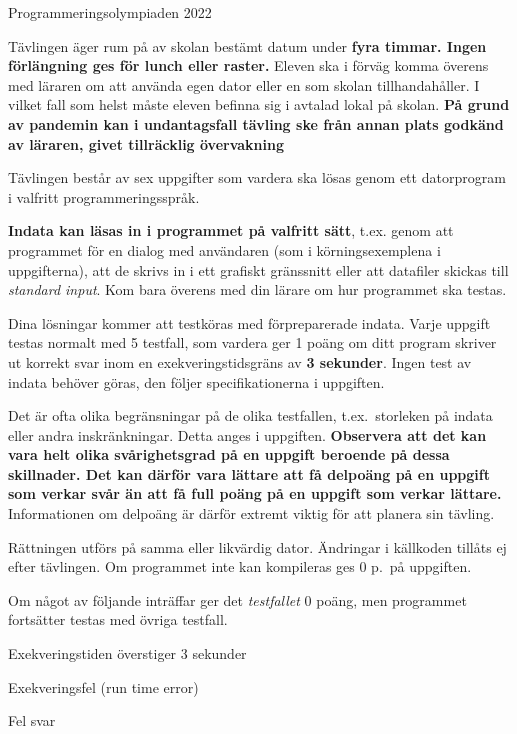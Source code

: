 
\thispagestyle{fancy}
\lstset{basicstyle=\ttfamily,
  breaklines=true}

\begin{center}
\Huge{Programmeringsolympiaden 2022}
\end{center}
\vspace{-1.2cm} 
\begin{lista}
\item Tävlingen äger rum på av skolan bestämt datum under {\bf fyra
    timmar. Ingen förlängning ges för lunch eller raster.} Eleven ska i förväg komma överens med läraren om att använda egen dator eller en som skolan tillhandahåller. I vilket fall som helst måste eleven befinna sig i avtalad lokal på skolan. {\bf På grund av pandemin kan i undantagsfall tävling ske från annan plats godkänd av läraren, givet tillräcklig övervakning}
\item Tävlingen består av sex uppgifter som vardera ska lösas genom ett
  datorprogram i valfritt programmeringsspråk.
\item {\bf Indata kan läsas in i programmet på valfritt sätt}, t.ex. genom att programmet för en dialog med användaren (som i körningsexemplena i uppgifterna), att de skrivs in i ett grafiskt gränssnitt eller att datafiler skickas till {\em standard input}. Kom bara överens med din lärare om hur programmet ska testas.
\item Dina lösningar kommer att testköras med förpreparerade
  indata. Varje uppgift testas normalt med 5 testfall, som vardera ger
  1 poäng om ditt program skriver ut korrekt svar inom en exekveringstidsgräns av
  {\bf 3 sekunder}. Ingen test av indata behöver göras, den följer specifikationerna 
i uppgiften.
\item Det är ofta olika begränsningar på de olika testfallen, t.ex.\ storleken på
indata eller andra inskränkningar. Detta anges i uppgiften. {\bf Observera att det kan vara
helt olika svårighetsgrad på en uppgift beroende på dessa skillnader. Det kan därför vara
lättare att få delpoäng på en uppgift som verkar svår än att få full
poäng på en uppgift som verkar lättare.} Informationen om delpoäng är
därför extremt viktig för att planera sin
tävling.
\item Rättningen utförs på samma eller likvärdig dator. Ändringar
  i källkoden tillåts ej efter tävlingen. Om programmet
  inte kan kompileras ges 0 p.\ på uppgiften. 
\item Om något av följande inträffar ger
  det {\em testfallet} 0 poäng, men programmet fortsätter testas med övriga testfall.
\begin{lista}
\item Exekveringstiden överstiger 3 sekunder \vspace{-0.2cm}
\item Exekveringsfel (run time error) \vspace{-0.2cm}
\item Fel svar \vspace{-0.2cm}
\end{lista}


\end{lista}
